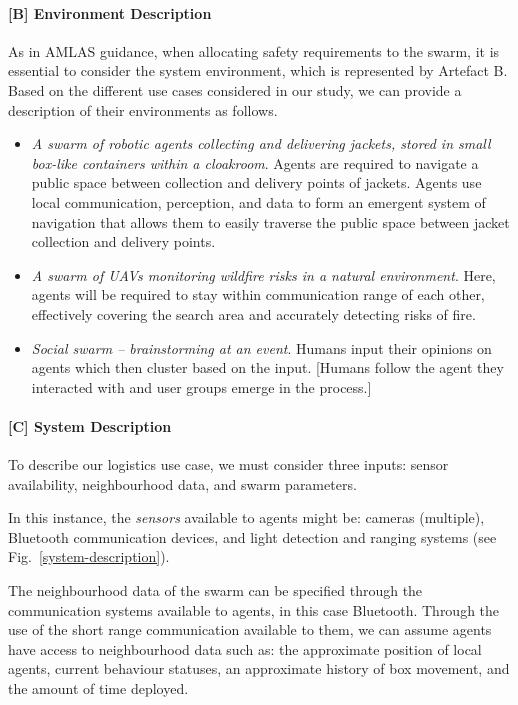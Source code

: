 \documentclass[lettersize,journal]{IEEEtran}
\begin{document}
\paragraph*{[B] Environment Description}
As in AMLAS guidance, when allocating safety requirements to the swarm, it is essential to consider the system environment, which is represented by Artefact B. 
Based on the different use cases considered in our study, we can provide a description of their environments as follows.
\begin{itemize}
	\item \textit{A swarm of robotic agents collecting and delivering jackets, stored in small box-like containers within a cloakroom}. Agents are required to navigate a public space between collection and delivery points of jackets. Agents use local communication, perception, and data to form an emergent system of navigation that allows them to easily traverse the public space between jacket collection and delivery points.
	\item \textit{A swarm of UAVs monitoring wildfire risks in a natural environment}. Here, agents will be required to stay within communication range of each other, effectively covering the search area and accurately detecting risks of fire.
	\item \textit{Social swarm – brainstorming at an event}. Humans input their opinions on agents which then cluster based on the input. [Humans follow the agent they interacted with and user groups emerge in the process.]
\end{itemize}

\paragraph*{[C] System Description}
To describe our logistics use case, we must consider three inputs: sensor availability, neighbourhood data, and swarm parameters. 

In this instance, the \textit{sensors} available to agents might be: cameras (multiple), Bluetooth communication devices, and light detection and ranging systems (see Fig.~\ref{system-description}). 

The neighbourhood data of the swarm can be specified through the communication systems available to agents, in this case Bluetooth. Through the use of the short range communication available to them, we can assume agents have access to neighbourhood data such as: the approximate position of local agents, current behaviour statuses, an approximate history of box movement, and the amount of time deployed. 
\end{document}
